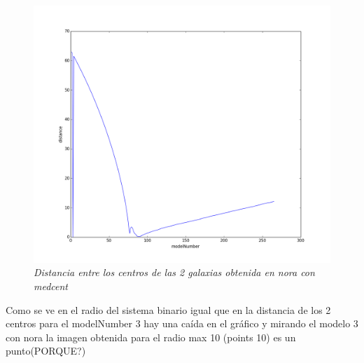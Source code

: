 \documentclass[12pt]{book}
\begin{document}
\begin{itemize}
\begin{figure}[h!]
 \centering
 \includegraphics[scale=0.4]{imgDistcon.png}
 \caption{\emph{Distancia entre los centros de las 2 galaxias obtenida en nora con medcent}}
 \label{Fig: 3}
\end{figure}

Como se ve en el radio del sistema binario igual que en la distancia de los 2 centros para el modelNumber 3 hay una caída en el gráfico y mirando el modelo 3 con nora la imagen obtenida para el radio max 10 (points 10) es un punto(PORQUE?)


\end{itemize}
\end{document}
